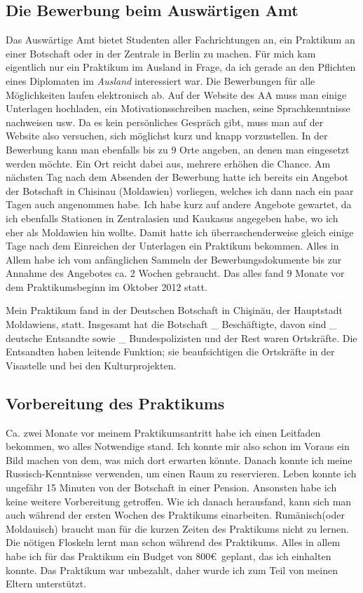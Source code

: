\documentclass{../../sem_paper}
\begin{document}
\subsection{Die Bewerbung beim Auswärtigen Amt}
Das Auswärtige Amt bietet Studenten aller Fachrichtungen an, ein Praktikum an einer Botschaft oder in der Zentrale in Berlin zu machen. Für mich kam eigentlich nur ein Praktikum im Ausland in Frage, da ich gerade an den Pflichten eines Diplomaten im \emph{Ausland} interessiert war. Die Bewerbungen für alle Möglichkeiten laufen elektronisch ab. Auf der Website des AA muss man einige Unterlagen hochladen, ein Motivationsschreiben machen, seine Sprachkenntnisse nachweisen usw. Da es kein persönliches Gespräch gibt, muss man auf der Website also versuchen, sich möglichst kurz und knapp vorzustellen. In der Bewerbung kann man ebenfalls bis zu 9 Orte angeben, an denen man eingesetzt werden möchte. Ein Ort reicht dabei aus, mehrere erhöhen die Chance. Am nächsten Tag nach dem Absenden der Bewerbung hatte ich bereits ein Angebot der Botschaft in Chisinau (Moldawien) vorliegen, welches ich dann nach ein paar Tagen auch angenommen habe. Ich habe kurz auf andere Angebote gewartet, da ich ebenfalls Stationen in Zentralasien und Kaukasus angegeben habe, wo ich eher als Moldawien hin wollte. Damit hatte ich überraschenderweise gleich einige Tage nach dem Einreichen der Unterlagen ein Praktikum bekommen. Alles in Allem habe ich vom anfänglichen Sammeln der Bewerbungsdokumente bis zur Annahme des Angebotes ca. 2 Wochen gebraucht. Das alles fand 9 Monate vor dem Praktikumsbeginn im Oktober 2012 statt.

Mein Praktikum fand in der Deutschen Botschaft in Chişinău, der Hauptstadt Moldawiens, statt. Insgesamt hat die Botschaft \_ Beschäftigte, davon sind \_ deutsche Entsandte sowie \_ Bundespolizisten und der Rest waren Ortskräfte. Die Entsandten haben leitende Funktion; sie beaufsichtigen die Ortskräfte in der Visastelle und bei den Kulturprojekten.

\subsection{Vorbereitung des Praktikums}
Ca. zwei Monate vor meinem Praktikumsantritt habe ich einen Leitfaden bekommen, wo alles Notwendige stand. Ich konnte mir also schon im Voraus ein Bild machen von dem, was mich dort erwarten könnte. Danach konnte ich meine Russisch-Kenntnisse verwenden, um einen Raum zu reservieren. Leben konnte ich ungefähr 15 Minuten von der Botschaft in einer Pension. Ansonsten habe ich keine weitere Vorbereitung getroffen. Wie ich danach herausfand, kann sich man auch während der ersten Wochen des Praktikums einarbeiten. Rumänisch(oder Moldauisch) braucht man für die kurzen Zeiten des Praktikums nicht zu lernen. Die nötigen Floskeln lernt man schon während des Praktikums. Alles in allem habe ich für das Praktikum ein Budget von 800\euro\ geplant, das ich einhalten konnte. Das Praktikum war unbezahlt, daher wurde ich zum Teil von meinen Eltern unterstützt.
\end{document}
